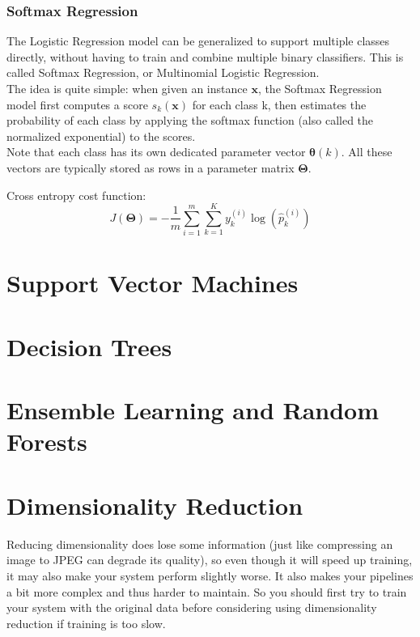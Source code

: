 \documentclass[french]{article}
\begin{document}
\subsubsection{Softmax Regression}

The Logistic Regression model can be generalized to support multiple classes directly, without having to train and combine multiple binary classifiers. This is called Softmax Regression, or Multinomial Logistic Regression.\\

The idea is quite simple: when given an instance $\bm{x}$, the Softmax Regression model first computes a score $s_k(\bm{x})$ for each class k, then estimates the probability of each class by applying the softmax function (also called the normalized exponential) to the scores.\\

Note that each class has its own dedicated parameter vector $\bm{\theta}(k)$. All these vectors are typically stored as rows in a parameter matrix $\bm{\Theta}$.

Cross entropy cost function:
\[J(\bm{\Theta}) = -\frac{1}{m} \sum_{i=1}^m \sum_{k=1}^K y_k^{(i)} \log(\hat p_k^{(i)})\]

\section{Support Vector Machines}

\section{Decision Trees}

\section{Ensemble Learning and Random Forests}

\section{Dimensionality Reduction}

Reducing dimensionality does lose some information (just like compressing an image to JPEG can degrade its quality), so even though it will speed up training, it may also make your system perform slightly worse. It also makes your pipelines a bit more complex and thus harder to maintain. So you should first try to train your system with the original data before considering using dimensionality reduction if training is too slow.
\end{document}
